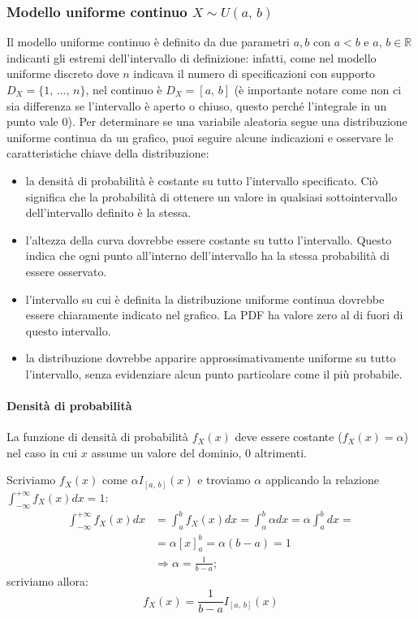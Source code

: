 \subsubsection{Modello uniforme continuo $X \sim U{(a,\,b)}$}
Il modello uniforme continuo è definito da due parametri $a,b$ con $a < b$ e $a ,\, b \in \mathbb R$ indicanti gli estremi dell'intervallo di definizione: infatti, come nel modello uniforme discreto dove $n$ indicava il numero di specificazioni con supporto $D_X = \{1, \, \dots ,\, n\}$, nel continuo è $D_X = [a,\,b]$ (è importante notare come non ci sia differenza se l'intervallo è aperto o chiuso, questo perché l'integrale in un punto vale $0$). 
\newline \newline
Per determinare se una variabile aleatoria segue una distribuzione uniforme continua da un grafico, puoi seguire alcune indicazioni e osservare le caratteristiche chiave della distribuzione:
\begin{itemize}
    \item la densità di probabilità è costante su tutto l'intervallo specificato. Ciò significa che la probabilità di ottenere un valore in qualsiasi sottointervallo dell'intervallo definito è la stessa.
    \item l'altezza della curva dovrebbe essere costante su tutto l'intervallo. Questo indica che ogni punto all'interno dell'intervallo ha la stessa probabilità di essere osservato.
    \item l'intervallo su cui è definita la distribuzione uniforme continua dovrebbe essere chiaramente indicato nel grafico. La PDF ha valore zero al di fuori di questo intervallo.
    \item la distribuzione dovrebbe apparire approssimativamente uniforme su tutto l'intervallo, senza evidenziare alcun punto particolare come il più probabile.
\end{itemize}

\paragraph{Densità di probabilità} La funzione di densità di probabilità $f_X(x)$ deve essere costante ($f_X(x) = \alpha$) nel caso in cui $x$ assume un valore del dominio, 0 altrimenti. 

\noindent Scriviamo $f_X(x)$ come $\alpha I_{[a,\,b]}(x)$ e troviamo $\alpha$ applicando la relazione $\int_{-\infty}^{+\infty} f_X(x) dx = 1$:
\begin{align*}
\int_{-\infty}^{+\infty} f_X(x) dx &= \int_a^b f_X(x) dx = \int_a^b \alpha dx = \alpha \int_a^b dx = \\
&= \alpha [x]^b_a = \alpha (b-a) = 1\\
&\Rightarrow {\alpha = \frac{1}{b-a}};
\end{align*}
scriviamo allora:
$$
\boxed{f_X(x) = \frac{1}{b-a} I_{[a,\,b]}(x)}
$$

